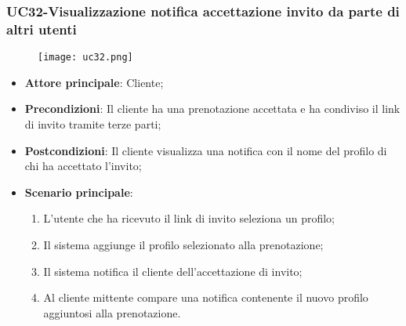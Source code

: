 \pagebreak
\subsubsection{UC32-Visualizzazione notifica accettazione invito da parte di altri utenti}
\begin{figure}[h] \texttt{[image: uc32.png]} \end{figure}

\begin{itemize}
\item \textbf{Attore principale}: Cliente;
\item \textbf{Precondizioni}: Il cliente ha una prenotazione accettata e ha condiviso il link di invito tramite terze parti;
\item \textbf{Postcondizioni}: Il cliente visualizza una notifica con il nome del profilo di chi ha accettato l'invito;
\item \textbf{Scenario principale}:
\begin{enumerate}
\item L'utente che ha ricevuto il link di invito seleziona un profilo;
\item Il sistema aggiunge il profilo selezionato alla prenotazione;
\item Il sistema notifica il cliente dell'accettazione di invito;
\item Al cliente mittente compare una notifica contenente il nuovo profilo aggiuntosi alla prenotazione.
\end{enumerate}
\end{itemize}

